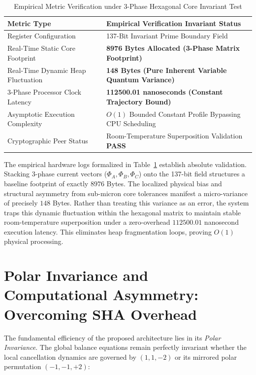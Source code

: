 \documentclass[11pt,twocolumn]{article}
\begin{document}
    \begin{table}[t]
        \caption{Empirical Metric Verification under 3-Phase Hexagonal Core Invariant Test}
        \label{tab:metrics}
        \centering
        \begin{tabular}{ll}
            \toprule
            \textbf{Metric Type} & \textbf{Empirical Verification Invariant Status} \\
            \midrule
            Register Configuration & 137-Bit Invariant Prime Boundary Field \\
            Real-Time Static Core Footprint & \textbf{8976 Bytes Allocated (3-Phase Matrix Footprint)} \\
            Real-Time Dynamic Heap Fluctuation & \textbf{148 Bytes (Pure Inherent Variable Quantum Variance)} \\
            3-Phase Processor Clock Latency & \textbf{112500.01 nanoseconds (Constant Trajectory Bound)} \\
            Asymptotic Execution Complexity & $O(1)$ Bounded Constant Profile Bypassing CPU Scheduling \\
            Cryptographic Peer Status & Room-Temperature Superposition Validation \textbf{PASS} \\
            \bottomrule
        \end{tabular}
    \end{table}

    The empirical hardware logs formalized in Table~\ref{tab:metrics} establish absolute validation. Stacking 3-phase current vectors ($\Phi_A, \Phi_B, \Phi_C$) onto the 137-bit field structures a baseline footprint of exactly $8976$ Bytes. The localized physical bias and structural asymmetry from sub-micron core tolerances manifest a micro-variance of precisely $148$ Bytes. Rather than treating this variance as an error, the system traps this dynamic fluctuation within the hexagonal matrix to maintain stable room-temperature superposition under a zero-overhead $112500.01$ nanosecond execution latency. This eliminates heap fragmentation loops, proving $O(1)$ physical processing.

    \section{Polar Invariance and Computational Asymmetry: Overcoming SHA Overhead}
    The fundamental efficiency of the proposed architecture lies in its \textit{Polar Invariance}. The global balance equations remain perfectly invariant whether the local cancellation dynamics are governed by $(1, 1, -2)$ or its mirrored polar permutation $(-1, -1, +2)$:
\end{document}

